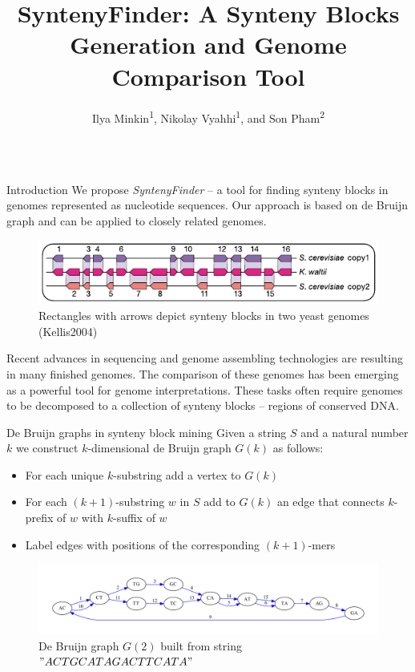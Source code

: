 \documentclass[final,hyperref={pdfpagelabels=false}]{beamer}
\title{SyntenyFinder: A Synteny Blocks Generation and Genome Comparison Tool}
\author{Ilya Minkin\textsuperscript{1}, Nikolay Vyahhi\textsuperscript{1}, and Son Pham\textsuperscript{2}}
\institute{\textsuperscript{1} St. Petersburg Academic University, St. Petersburg, Russia \\ \textsuperscript{2} University of California, San Diego, USA}
\begin{document}
\begin{frame}{}

\begin{columns}[t]

\begin{column}{0.32\linewidth}

\begin{block}{Introduction} \justifying
We propose \textit{SyntenyFinder} -- a tool for finding synteny blocks in genomes represented as nucleotide sequences.
Our approach is based on de Bruijn graph and can be applied to closely related genomes.
\begin{figure}
	\centering
	\includegraphics[scale = 2.8]{syntenyBlocks.pdf}
	\small \caption{Rectangles with arrows depict synteny blocks in two yeast genomes (Kellis2004)}
\end{figure}
Recent advances in sequencing and genome assembling technologies are resulting in many finished genomes.
The comparison of these genomes has been emerging as a powerful tool for genome interpretations.
These tasks often require genomes to be  decomposed to a collection of synteny blocks -- regions of conserved DNA.
\end{block}

\begin{block}{De Bruijn graphs in synteny block mining} \justifying
Given a string \(S\) and a natural number \(k\) we construct \(k\)-dimensional de Bruijn graph \(G(k)\) as follows:

\begin{itemize}
\item For each unique \(k\)-substring add a vertex to \(G(k)\)
\item For each \((k + 1)\)-substring \(w\) in \(S\) add to \(G(k)\) an edge that connects \(k\)-prefix of \(w\) with \(k\)-suffix of \(w\)
\item Label edges with positions of the corresponding \((k + 1)\)-mers
\end{itemize}

\begin{figure}
	\centering
	\includegraphics[scale = 0.78]{simpleGraph.pdf}
	\small \caption{De Bruijn graph \(G(2)\) built from string \("ACTGCATAGACTTCATA"\)}
\end{figure}


\end{block}
\end{column}
\end{columns}
\end{frame}
\end{document}
